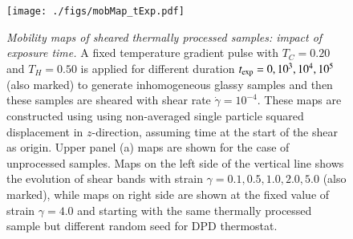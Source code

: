 \begin{figure}[hbt!]
\centering
\texttt{[image: ./figs/mobMap\_tExp.pdf]}
\caption[{\em Mobility maps of sheared thermally processed samples: impact of exposure time}]{{\em Mobility maps of sheared thermally processed samples: impact of exposure time.} A fixed temperature gradient pulse with $T_C = 0.20$ and $T_H = 0.50$ is applied for different duration $t_{\rm exp} = 0, 10^3, 10^4, 10^5$ (also marked) to generate inhomogeneous glassy samples and then these samples are sheared with shear rate $\dot{\gamma} = 10^{-4}$. These maps are constructed using using non-averaged single particle squared displacement in $z$-direction, assuming time at the start of the shear as origin. Upper panel (a) maps are shown for the case of unprocessed samples. Maps on the left side of the vertical line shows the evolution of shear bands with strain $\gamma = 0.1, 0.5, 1.0, 2.0, 5.0$ (also marked), while maps on right side are shown at the fixed value of strain $\gamma = 4.0$ and starting with the same thermally processed sample but different random seed for DPD thermostat.}
\label{mapVaryExp}
\end{figure}


